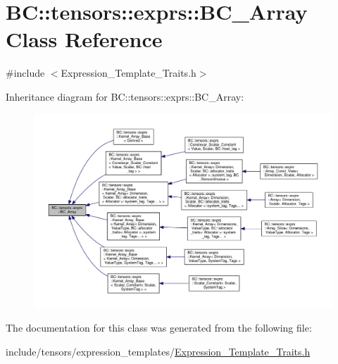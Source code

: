 \hypertarget{classBC_1_1tensors_1_1exprs_1_1BC__Array}{}\section{BC\+:\+:tensors\+:\+:exprs\+:\+:B\+C\+\_\+\+Array Class Reference}
\label{classBC_1_1tensors_1_1exprs_1_1BC__Array}


{\ttfamily \#include $<$Expression\+\_\+\+Template\+\_\+\+Traits.\+h$>$}



Inheritance diagram for BC\+:\+:tensors\+:\+:exprs\+:\+:B\+C\+\_\+\+Array\+:
\nopagebreak
\begin{figure}[H]
\begin{center}
\leavevmode
\includegraphics[width=350pt]{classBC_1_1tensors_1_1exprs_1_1BC__Array__inherit__graph}
\end{center}
\end{figure}


The documentation for this class was generated from the following file\+:\begin{DoxyCompactItemize}
\item 
include/tensors/expression\+\_\+templates/\hyperlink{Expression__Template__Traits_8h}{Expression\+\_\+\+Template\+\_\+\+Traits.\+h}\end{DoxyCompactItemize}
